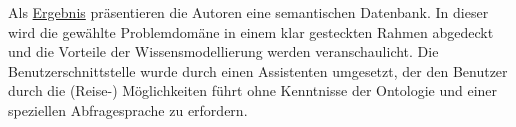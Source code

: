 Als \underline{Ergebnis} präsentieren die Autoren eine semantischen Datenbank. In dieser wird die gewählte Problemdomäne in einem klar gesteckten Rahmen abgedeckt und die Vorteile der Wissensmodellierung werden veranschaulicht. Die Benutzerschnittstelle wurde durch einen Assistenten umgesetzt, der den Benutzer durch die (Reise-) Möglichkeiten führt ohne Kenntnisse der Ontologie und einer speziellen Abfragesprache zu erfordern.


